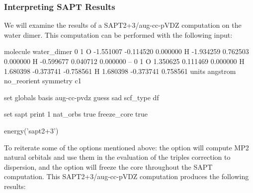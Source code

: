 \subsubsection{Interpreting SAPT Results}

We will examine the results of a SAPT2+3/aug-cc-pVDZ computation on the
water dimer. This computation can be performed with the following 
input:
\begin{Snippet}

molecule water_dimer {
     0 1
     O  -1.551007  -0.114520   0.000000
     H  -1.934259   0.762503   0.000000
     H  -0.599677   0.040712   0.000000
     --
     0 1
     O   1.350625   0.111469   0.000000
     H   1.680398  -0.373741  -0.758561
     H   1.680398  -0.373741   0.758561
     units angstrom
     no_reorient
     symmetry c1
}

set globals {
    basis          aug-cc-pvdz
    guess          sad
    scf_type       df
}

set sapt {
    print          1
    nat_orbs       true
    freeze_core    true
}

energy('sapt2+3')

\end{Snippet}
To reiterate some of the options mentioned above: the
 option will compute MP2 natural orbitals and use
them in the evaluation of the triples correction to dispersion, and the
 option will freeze the core throughout the SAPT
computation. This SAPT2+3/aug-cc-pVDZ computation produces the following
results:
